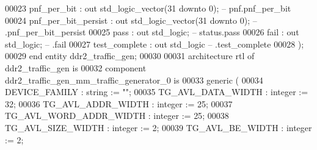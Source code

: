 \begin{DoxyCode}
00023         \textcolor{vhdlchar}{pnf\_per\_bit}         \textcolor{vhdlchar}{:} \textcolor{keywordflow}{out} \textcolor{comment}{std\_logic\_vector}\textcolor{vhdlchar}{(}\textcolor{vhdllogic}{}\textcolor{vhdllogic}{31} \textcolor{keywordflow}{downto} \textcolor{vhdllogic}{}\textcolor{vhdllogic}{0}\textcolor{vhdlchar}{)};\textcolor{keyword}{                    --      
       pnf.pnf\_per\_bit}
00024         \textcolor{vhdlchar}{pnf\_per\_bit\_persist} \textcolor{vhdlchar}{:} \textcolor{keywordflow}{out} \textcolor{comment}{std\_logic\_vector}\textcolor{vhdlchar}{(}\textcolor{vhdllogic}{}\textcolor{vhdllogic}{31} \textcolor{keywordflow}{downto} \textcolor{vhdllogic}{}\textcolor{vhdllogic}{0}\textcolor{vhdlchar}{)};\textcolor{keyword}{                    --         
       .pnf\_per\_bit\_persist}
00025         \textcolor{vhdlchar}{pass}                \textcolor{vhdlchar}{:} \textcolor{keywordflow}{out} \textcolor{comment}{std\_logic};\textcolor{keyword}{                                        --    status.pass}
00026         \textcolor{vhdlchar}{fail}                \textcolor{vhdlchar}{:} \textcolor{keywordflow}{out} \textcolor{comment}{std\_logic};\textcolor{keyword}{                                        --          .fail}
00027         \textcolor{vhdlchar}{test\_complete}       \textcolor{vhdlchar}{:} \textcolor{keywordflow}{out} \textcolor{comment}{std\_logic}\textcolor{keyword}{                                         --         
       .test\_complete}
00028     \textcolor{vhdlchar}{)};
00029 \textcolor{keywordflow}{end} \textcolor{keywordflow}{entity} \textcolor{vhdlchar}{ddr2\_traffic\_gen};
00030 
00031 \textcolor{keywordflow}{architecture} rtl \textcolor{keywordflow}{of} ddr2\_traffic\_gen is
00032     \textcolor{keywordflow}{component} ddr2\_traffic\_gen\_mm\_traffic\_generator\_0 \textcolor{keywordflow}{is}
00033         \textcolor{keywordflow}{generic} (
00034             DEVICE\_FAMILY                          : \textcolor{comment}{string}  := "";
00035             TG\_AVL\_DATA\_WIDTH                      : \textcolor{comment}{integer} := \textcolor{vhdllogic}{}\textcolor{vhdllogic}{32};
00036             TG\_AVL\_ADDR\_WIDTH                      : \textcolor{comment}{integer} := \textcolor{vhdllogic}{}\textcolor{vhdllogic}{25};
00037             TG\_AVL\_WORD\_ADDR\_WIDTH                 : \textcolor{comment}{integer} := \textcolor{vhdllogic}{}\textcolor{vhdllogic}{25};
00038             TG\_AVL\_SIZE\_WIDTH                      : \textcolor{comment}{integer} := \textcolor{vhdllogic}{}\textcolor{vhdllogic}{2};
00039             TG\_AVL\_BE\_WIDTH                        : \textcolor{comment}{integer} := \textcolor{vhdllogic}{}\textcolor{vhdllogic}{2};

\end{DoxyCode}
